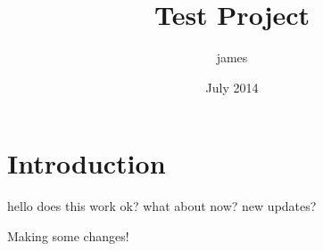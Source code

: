 \documentclass{article}
\title{Test Project}
\author{james }
\date{July 2014}
\begin{document}
\maketitle

\section{Introduction}

hello does this work ok? what about now? new updates?

Making some changes!
\end{document}
